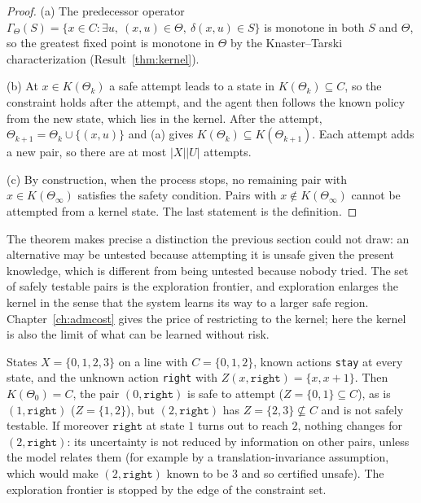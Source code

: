 \begin{proof}
(a) The predecessor operator $\Gamma_\Theta(S)=\{x\in C: \exists u,\ (x,u)\in\Theta,\ \delta(x,u)\in S\}$ is monotone in both $S$ and $\Theta$, so the greatest fixed point is monotone in $\Theta$ by the Knaster--Tarski characterization (Result~\ref{thm:kernel}).

(b) At $x\in K(\Theta_k)$ a safe attempt leads to a state in $K(\Theta_k)\subseteq C$, so the constraint holds after the attempt, and the agent then follows the known policy from the new state, which lies in the kernel. After the attempt, $\Theta_{k+1}=\Theta_k\cup\{(x,u)\}$ and (a) gives $K(\Theta_k)\subseteq K(\Theta_{k+1})$. Each attempt adds a new pair, so there are at most $|X||U|$ attempts.

(c) By construction, when the process stops, no remaining pair with $x\in K(\Theta_\infty)$ satisfies the safety condition. Pairs with $x\notin K(\Theta_\infty)$ cannot be attempted from a kernel state. The last statement is the definition.
\end{proof}

The theorem makes precise a distinction the previous section could not draw: an alternative may be untested because attempting it is unsafe given the present knowledge, which is different from being untested because nobody tried. The set of safely testable pairs is the exploration frontier, and exploration enlarges the kernel in the sense that the system learns its way to a larger safe region. Chapter~\ref{ch:admcost} gives the price of restricting to the kernel; here the kernel is also the limit of what can be learned without risk.

\begin{example}\label{ex:frontier}
States $X=\{0,1,2,3\}$ on a line with $C=\{0,1,2\}$, known actions \texttt{stay} at every state, and the unknown action \texttt{right} with $Z(x,\texttt{right})=\{x,x+1\}$. Then $K(\Theta_0)=C$, the pair $(0,\texttt{right})$ is safe to attempt ($Z=\{0,1\}\subseteq C$), as is $(1,\texttt{right})$ ($Z=\{1,2\}$), but $(2,\texttt{right})$ has $Z=\{2,3\}\not\subseteq C$ and is not safely testable. If moreover $\texttt{right}$ at state $1$ turns out to reach $2$, nothing changes for $(2,\texttt{right})$: its uncertainty is not reduced by information on other pairs, unless the model relates them (for example by a translation-invariance assumption, which would make $(2,\texttt{right})$ known to be $3$ and so certified unsafe). The exploration frontier is stopped by the edge of the constraint set.
\end{example}


